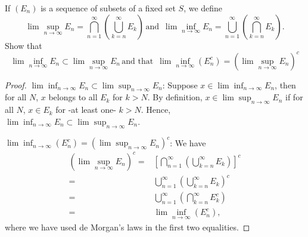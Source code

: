 \begin{exercise}{37}
If $(E_n)$ is a sequence of subsets of a fixed set $S$, we define
\[
\lim\sup_{n\to\infty}E_n=\bigcap_{n=1}^\infty\left(\bigcup_{k=n}^\infty E_k\right)
\,\text{and }\,
\lim\inf_{n\to\infty}E_n=\bigcup_{n=1}^\infty\left(\bigcap_{k=n}^\infty E_k\right).
\]
Show that 
\[
\lim\inf_{n\to\infty}E_n\subset\lim\sup_{n\to\infty}E_n
\,\text{and that }\,
\lim\inf_{n\to\infty}(E_n^c)= \left(\lim\sup_{n\to\infty}E_n\right)^c
\]
\end{exercise}
\begin{proof}
$\lim\inf_{n\to\infty}E_n\subset\lim\sup_{n\to\infty}E_n$: Suppose $x\in \lim\inf_{n\to\infty}E_n$, then for all $N$, $x$ belongs to all $E_k$ for $k>N$. By definition, $x\in\lim\sup_{n\to\infty}E_n$ if for all $N$, $x\in E_k$ for -at least one- $k>N$. Hence, $\lim\inf_{n\to\infty}E_n\subset\lim\sup_{n\to\infty}E_n$.

$\lim\inf_{n\to\infty}(E_n^c)= \left(\lim\sup_{n\to\infty}E_n\right)^c$:  We have
\begin{align*}
\left(\lim\sup_{n\to\infty}E_n\right)^c =& \left[\bigcap_{n=1}^\infty\left(\bigcup_{k=n}^\infty E_k\right)\right]^c\\
=& \bigcup_{n=1}^\infty\left(\bigcup_{k=n}^\infty E_k\right)^c\\
=& \bigcup_{n=1}^\infty\left(\bigcap_{k=n}^\infty E_k^c\right)\\
=& \lim\inf_{n\to\infty}(E_n^c),
\end{align*}
where we have used de Morgan's laws in the first two equalities.
\end{proof}
